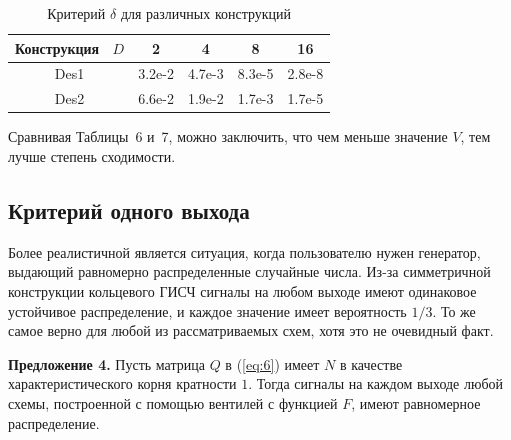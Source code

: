 \documentclass[a4paper,12pt]{article}
\begin{document}
\begin{table}[h]
\centering
\caption{Критерий $\delta$ для различных конструкций}
\label{tab:7}
\begin{tabular}{c|cccc}
Конструкция \ $D$ & 2 & 4 & 8 & 16 \\ \hline
Des1 & 3.2e-2 & 4.7e-3 & 8.3e-5 & 2.8e-8 \\
Des2 & 6.6e-2 & 1.9e-2 & 1.7e-3 & 1.7e-5
\end{tabular}
\end{table}

Сравнивая Таблицы~6 и~7, можно заключить, что чем меньше значение $V$, тем лучше степень сходимости.

\subsection{Критерий одного выхода}

Более реалистичной является ситуация, когда пользователю нужен генератор, выдающий равномерно распределенные случайные числа. Из-за симметричной конструкции кольцевого ГИСЧ сигналы на любом выходе имеют одинаковое устойчивое распределение, и каждое значение имеет вероятность $1/3$. То же самое верно для любой из рассматриваемых схем, хотя это не очевидный факт.

\textbf{Предложение 4.} Пусть матрица $Q$ в (\ref{eq:6}) имеет $N$ в качестве характеристического корня кратности $1$. Тогда сигналы на каждом выходе любой схемы, построенной с помощью вентилей с функцией $F$, имеют равномерное распределение.
\end{document}
